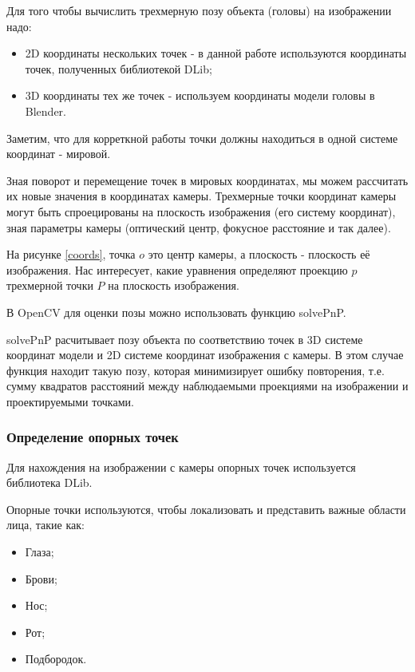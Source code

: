 Для того чтобы вычислить трехмерную позу объекта (головы) на изображении надо:

\begin{itemize}
	\item 2D координаты нескольких точек - в данной работе используются координаты точек, полученных библиотекой DLib;
	\item 3D координаты тех же точек - используем координаты модели головы в Blender.
\end{itemize}

Заметим, что для корреткной работы точки должны находиться в одной системе координат - мировой.

Зная поворот и перемещение точек в мировых координатах, мы можем рассчитать их новые значения в координатах камеры. Трехмерные точки координат камеры могут быть спроецированы на плоскость изображения (его систему координат), зная параметры камеры (оптический центр, фокусное расстояние и так далее).


На рисунке \ref{coords}, точка $o$ это центр камеры, а плоскость - плоскость её изображения. Нас интересует, какие уравнения определяют проекцию $p$ трехмерной точки $P$ на плоскость изображения.

В OpenCV для оценки позы можно использовать функцию solvePnP.

solvePnP расчитывает позу объекта по соответствию точек в 3D системе координат модели и 2D системе координат изображения с камеры. В этом случае функция находит такую позу, которая минимизирует ошибку повторения, т.е. сумму квадратов расстояний между наблюдаемыми проекциями на изображении и проектируемыми точками.


\subsubsection{Определение опорных точек}

Для нахождения на изображении с камеры опорных точек используется библиотека DLib.

Опорные точки используются, чтобы локализовать и представить важные области лица, такие как:
\begin{itemize}
	\item Глаза;
	\item Брови;
	\item Нос;
	\item Рот;
	\item Подбородок.
\end{itemize}

